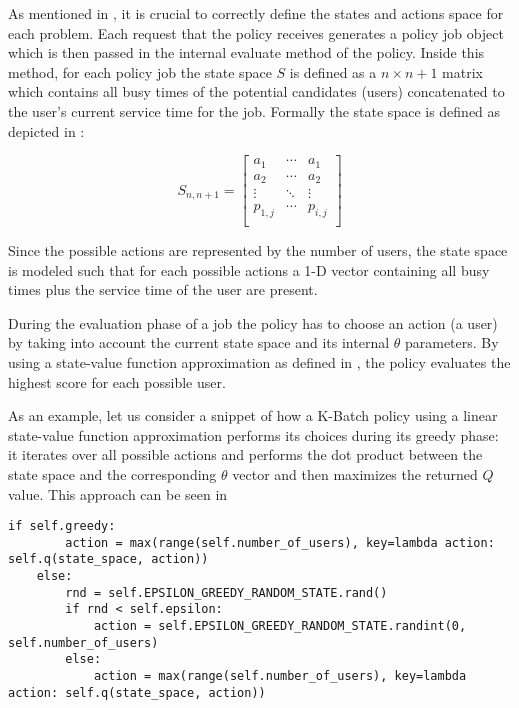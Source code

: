 \documentclass{seal_thesis}
\begin{document}
As mentioned in , it is crucial to correctly define the states and actions space for each problem. Each request that the policy receives generates a policy job object which is then passed in the internal evaluate method of the policy. Inside this method, for each policy job the state space $S$ is defined as a $n \times n+1$ matrix which contains all busy times of the potential candidates (\ie users) concatenated to the user's current service time for the job. Formally the state space is defined as depicted in :

\begin{equation}
\label{eq:kbatch_sp}
	S_{n,n+1} = 
	\begin{bmatrix}
	a_1 & \cdots & a_1 \\
	a_2 & \cdots & a_2 \\
	\vdots & \ddots & \vdots \\
	p_{1,j} & \cdots & p_{i,j} \\
	\end{bmatrix}
\end{equation}

Since the possible actions are represented by the number of users, the state space is modeled such that for each possible actions a 1-D vector containing all busy times plus the service time of the user are present.

During the evaluation phase of a job the policy has to choose an action (\ie a user) by taking into account the current state space and its internal $\theta$ parameters. By using a state-value function approximation as defined in , the policy evaluates the highest score for each possible user.

As an example, let us consider a snippet of how a K-Batch policy using a linear state-value function approximation performs its choices during its greedy phase: it iterates over all possible actions and performs the dot product between the state space and the corresponding $\theta$ vector and then maximizes the returned $Q$ value. This approach can be seen in  

\begin{lstlisting}[caption=Epsilon greedy approach,label=lst:e_greedy,style=CustomPython]
    if self.greedy:
        action = max(range(self.number_of_users), key=lambda action: self.q(state_space, action))
    else:
        rnd = self.EPSILON_GREEDY_RANDOM_STATE.rand()
        if rnd < self.epsilon:
            action = self.EPSILON_GREEDY_RANDOM_STATE.randint(0, self.number_of_users)
        else:
            action = max(range(self.number_of_users), key=lambda action: self.q(state_space, action))
\end{lstlisting}
\end{document}
